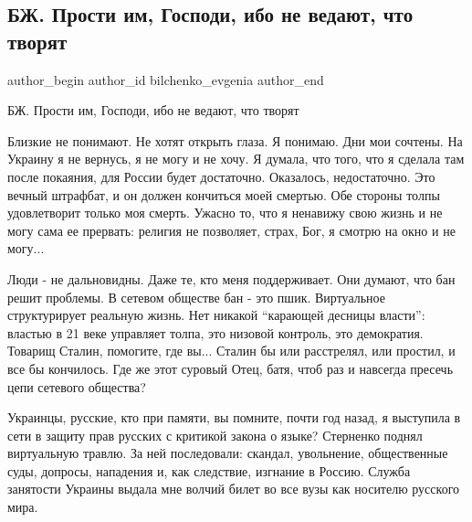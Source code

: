  
 
 
 
 

\subsection{БЖ. Прости им, Господи, ибо не ведают, что творят}
\label{sec:20_12_2021.tg.bilchenko_evgenia.1.prosti_im_gospodi}

\ifcmt
 author_begin
   author_id bilchenko_evgenia
 author_end
\fi

БЖ. Прости им, Господи, ибо не ведают, что творят

Близкие не понимают. Не хотят открыть глаза. Я понимаю. Дни мои сочтены. На
Украину я не вернусь, я не могу и не хочу. Я думала, что того, что я сделала
там после покаяния, для России будет достаточно. Оказалось, недостаточно. Это
вечный штрафбат, и он должен кончиться моей смертью. Обе стороны толпы
удовлетворит только моя смерть. Ужасно то, что я ненавижу свою жизнь и не могу
сама ее прервать: религия не позволяет, страх, Бог, я смотрю на окно и не
могу... 


Люди - не дальновидны. Даже те, кто меня поддерживает. Они думают, что бан
решит проблемы. В сетевом обществе бан - это пшик. Виртуальное структурирует
реальную жизнь. Нет никакой \enquote{карающей десницы власти}: властью в 21 веке
управляет толпа, это низовой контроль, это демократия. Товарищ Сталин,
помогите, где вы... Сталин бы или расстрелял, или простил, и все бы кончилось.
Где же этот суровый Отец, батя, чтоб раз и навсегда пресечь цепи сетевого
общества?

Украинцы, русские, кто при памяти, вы помните, почти год назад, я выступила в
сети в защиту прав русских с критикой закона о языке? Стерненко поднял
виртуальную травлю. За ней последовали: скандал, увольнение, общественные суды,
допросы, нападения и, как следствие, изгнание в Россию. Служба занятости
Украины выдала мне волчий билет во все вузы как носителю русского мира.

